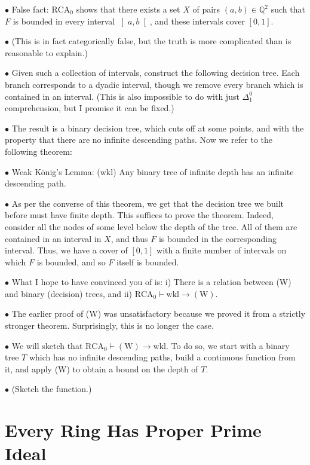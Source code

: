 \documentclass{article}
\theoremstyle{nonumberplain}
\newcommand{\Q}{\mathbb{Q}}
\newcommand{\RCA}{\mathrm{RCA}}
\newcommand{\wkl}{\mathrm{wkl}}
\newcommand\point[1]{\noindent \hspace{\labelsep} $\bullet$ #1 \smallskip}
\newcommand\timestamp[1]{}
\newcommand\thname[1]{\mathrm{(#1)}}
\begin{document}
\point{False fact: $\RCA_0$ shows that there exists a set $X$ of pairs $(a,b) \in \Q^2$ such that $F$ is bounded in every interval $\left]a,b\right[$, and these intervals cover $[0,1]$.}

\point{(This is in fact categorically false, but the truth is more complicated than is reasonable to explain.)}

\point{Given such a collection of intervals, construct the following decision tree. Each branch corresponds to a dyadic interval, though we remove every branch which is contained in an interval. (This is also impossible to do with just $\Delta^0_1$ comprehension, but I promise it can be fixed.)}

\point{The result is a binary decision tree, which cuts off at some points, and with the property that there are no infinite descending paths. Now we refer to the following theorem:}

\point{Weak König's Lemma: ($\wkl$) Any binary tree of infinite depth has an infinite descending path.}

\point{As per the converse of this theorem, we get that the decision tree we built before must have finite depth. This suffices to prove the theorem. Indeed, consider all the nodes of some level below the depth of the tree. All of them are contained in an interval in $X$, and thus $F$ is bounded in the corresponding interval. Thus, we have a cover of $[0,1]$ with a finite number of intervals on which $F$ is bounded, and so $F$ itself is bounded.}

\point{What I hope to have convinced you of is: i) There is a relation between (W) and binary (decision) trees, and ii) $\RCA_0 \vdash \wkl \rightarrow \thname W$.}

\point{The earlier proof of (W) was unsatisfactory because we proved it from a strictly stronger theorem. Surprisingly, this is no longer the case.}

\point{We will sketch that $\RCA_0 \vdash \thname W \rightarrow \wkl$. To do so, we start with a binary tree $T$ which has no infinite descending paths, build a continuous function from it, and apply (W) to obtain a bound on the depth of $T$.}

\point{(Sketch the function.)}

\timestamp{43 minutes}

\section{Every Ring Has Proper Prime Ideal}
\end{document}
